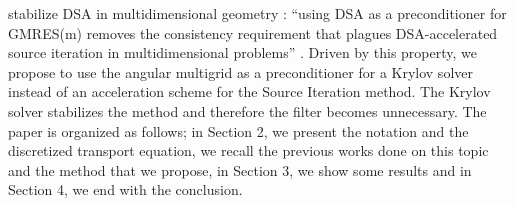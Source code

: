 stabilize DSA in multidimensional geometry : ``using DSA as a preconditioner
for GMRES(m) removes the consistency requirement that plagues DSA-accelerated
source iteration in multidimensional problems'' \cite{ttg}. Driven by this
property, we propose to use the angular multigrid as a preconditioner for a 
Krylov solver instead of an acceleration scheme for the Source Iteration
method. The Krylov solver stabilizes the method and therefore the filter becomes
unnecessary. The paper is organized as follows; in Section 2, we present the
notation and the discretized transport equation,  we recall the
previous works done on this topic and the method that we propose, in Section
3, we show some results and in Section 4, we end with the conclusion.
